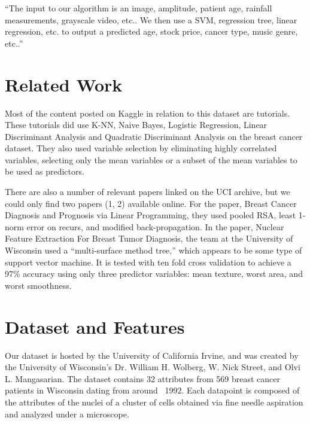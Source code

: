 \documentclass[15pt]{cup-pan}
\begin{document}
\begin{adjustwidth*}{-1.5in}{-0in}

“The input to our algorithm is an {image, amplitude, patient age, rainfall measurements, grayscale video, etc.}. We then use a {SVM, regression tree, linear regression, etc.} to output a predicted {age, stock price, cancer type, music genre, etc.}.” 

\bigskip


\section{Related Work}


Most of the content posted on Kaggle in relation to this dataset are tutorials. These tutorials did use K-NN, Naive Bayes, Logistic Regression, Linear Discriminant Analysis and Quadratic Discriminant Analysis on the breast cancer dataset. They also used variable selection by eliminating highly correlated variables, selecting only the mean variables or a subset of the mean variables to be used as predictors. 

\bigskip
 
There are also a number of relevant papers linked on the UCI archive, but we could only find two papers (1, 2) available online. For the paper, Breast Cancer Diagnosis and Prognosis via Linear Programming, they used pooled RSA, least 1-norm error on recurs, and modified back-propagation. In the paper, Nuclear Feature Extraction For Breast Tumor Diagnosis, the team at the University of Wisconsin used a “multi-surface method tree,” which appears to be some type of support vector machine. It is tested with ten fold cross validation to achieve a 97\% accuracy using only three  predictor variables: mean texture, worst area, and worst smoothness. 

\newpage 

\section{Dataset and Features}

Our dataset is hosted by the University of California Irvine, and was created by the University of Wisconsin’s Dr. William H. Wolberg, W. Nick Street, and Olvi L. Mangasarian. The dataset contains 32 attributes from 569 breast cancer patients in Wisconsin dating from around ~1992. Each datapoint is composed of the attributes of the nuclei of a cluster of cells obtained via fine needle aspiration and analyzed under a microscope.


\end{adjustwidth*}
\end{document}
